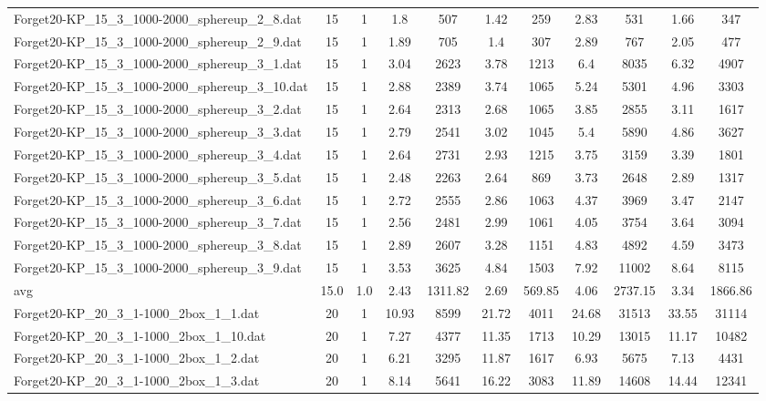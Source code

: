 \begin{table}[!ht]
\begin{tabular}{lcccccccccc}
Forget20-KP\_15\_3\_1000-2000\_sphereup\_2\_8.dat & 15 & 1 & 1.8 & 507 & 1.42 & 259 & 2.83 & 531 & 1.66 & 347 \\
Forget20-KP\_15\_3\_1000-2000\_sphereup\_2\_9.dat & 15 & 1 & 1.89 & 705 & 1.4 & 307 & 2.89 & 767 & 2.05 & 477 \\
Forget20-KP\_15\_3\_1000-2000\_sphereup\_3\_1.dat & 15 & 1 & 3.04 & 2623 & 3.78 & 1213 & 6.4 & 8035 & 6.32 & 4907 \\
Forget20-KP\_15\_3\_1000-2000\_sphereup\_3\_10.dat & 15 & 1 & 2.88 & 2389 & 3.74 & 1065 & 5.24 & 5301 & 4.96 & 3303 \\
Forget20-KP\_15\_3\_1000-2000\_sphereup\_3\_2.dat & 15 & 1 & 2.64 & 2313 & 2.68 & 1065 & 3.85 & 2855 & 3.11 & 1617 \\
Forget20-KP\_15\_3\_1000-2000\_sphereup\_3\_3.dat & 15 & 1 & 2.79 & 2541 & 3.02 & 1045 & 5.4 & 5890 & 4.86 & 3627 \\
Forget20-KP\_15\_3\_1000-2000\_sphereup\_3\_4.dat & 15 & 1 & 2.64 & 2731 & 2.93 & 1215 & 3.75 & 3159 & 3.39 & 1801 \\
Forget20-KP\_15\_3\_1000-2000\_sphereup\_3\_5.dat & 15 & 1 & 2.48 & 2263 & 2.64 & 869 & 3.73 & 2648 & 2.89 & 1317 \\
Forget20-KP\_15\_3\_1000-2000\_sphereup\_3\_6.dat & 15 & 1 & 2.72 & 2555 & 2.86 & 1063 & 4.37 & 3969 & 3.47 & 2147 \\
Forget20-KP\_15\_3\_1000-2000\_sphereup\_3\_7.dat & 15 & 1 & 2.56 & 2481 & 2.99 & 1061 & 4.05 & 3754 & 3.64 & 3094 \\
Forget20-KP\_15\_3\_1000-2000\_sphereup\_3\_8.dat & 15 & 1 & 2.89 & 2607 & 3.28 & 1151 & 4.83 & 4892 & 4.59 & 3473 \\
Forget20-KP\_15\_3\_1000-2000\_sphereup\_3\_9.dat & 15 & 1 & 3.53 & 3625 & 4.84 & 1503 & 7.92 & 11002 & 8.64 & 8115 \\
\hline avg & 15.0 & 1.0 & 2.43& 1311.82 & 2.69& 569.85 & 4.06& 2737.15 & 3.34& 1866.86\\ \hline
Forget20-KP\_20\_3\_1-1000\_2box\_1\_1.dat & 20 & 1 & 10.93 & 8599 & 21.72 & 4011 & 24.68 & 31513 & 33.55 & 31114 \\
Forget20-KP\_20\_3\_1-1000\_2box\_1\_10.dat & 20 & 1 & 7.27 & 4377 & 11.35 & 1713 & 10.29 & 13015 & 11.17 & 10482 \\
Forget20-KP\_20\_3\_1-1000\_2box\_1\_2.dat & 20 & 1 & 6.21 & 3295 & 11.87 & 1617 & 6.93 & 5675 & 7.13 & 4431 \\
Forget20-KP\_20\_3\_1-1000\_2box\_1\_3.dat & 20 & 1 & 8.14 & 5641 & 16.22 & 3083 & 11.89 & 14608 & 14.44 & 12341 \\

\end{tabular}
\end{table}
